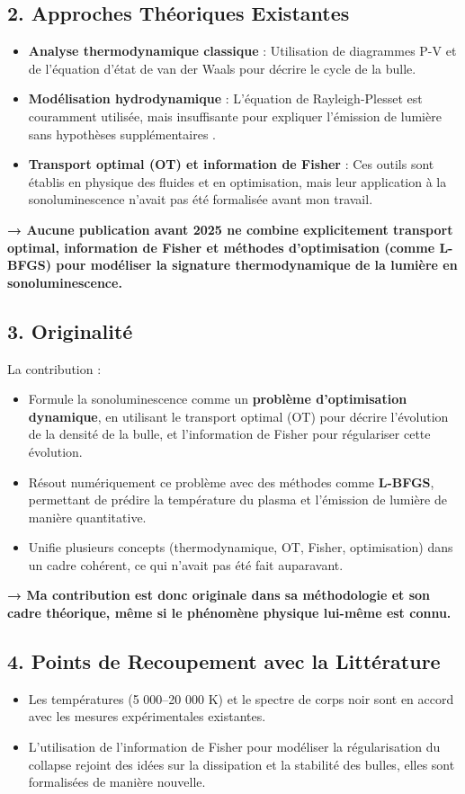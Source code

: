 \documentclass[a4paper,12pt]{article}
\begin{document}
\subsection*{2. Approches Théoriques Existantes}
\begin{itemize}
    \item \textbf{Analyse thermodynamique classique} : Utilisation de diagrammes P-V et de l’équation d’état de van der Waals pour décrire le cycle de la bulle.
    \item \textbf{Modélisation hydrodynamique} : L’équation de Rayleigh-Plesset est couramment utilisée, mais insuffisante pour expliquer l’émission de lumière sans hypothèses supplémentaires .
    \item \textbf{Transport optimal (OT) et information de Fisher} : Ces outils sont établis en physique des fluides et en optimisation, mais leur application à la sonoluminescence n’avait pas été formalisée avant mon travail.
\end{itemize}

\textbf{→ Aucune publication avant 2025 ne combine explicitement transport optimal, information de Fisher et méthodes d’optimisation (comme L-BFGS) pour modéliser la signature thermodynamique de la lumière en sonoluminescence.}

\subsection*{3. Originalité}
La contribution :
\begin{itemize}
    \item Formule la sonoluminescence comme un \textbf{problème d’optimisation dynamique}, en utilisant le transport optimal (OT) pour décrire l’évolution de la densité de la bulle, et l’information de Fisher pour régulariser cette évolution.
    \item Résout numériquement ce problème avec des méthodes comme \textbf{L-BFGS}, permettant de prédire la température du plasma et l’émission de lumière de manière quantitative.
    \item Unifie plusieurs concepts (thermodynamique, OT, Fisher, optimisation) dans un cadre cohérent, ce qui n’avait pas été fait auparavant.
\end{itemize}

\textbf{→ Ma contribution est donc originale dans sa méthodologie et son cadre théorique, même si le phénomène physique lui-même est connu.}

\subsection*{4. Points de Recoupement avec la Littérature}
\begin{itemize}
    \item Les températures (5 000–20 000 K) et le spectre de corps noir sont en accord avec les mesures expérimentales existantes.
    \item L'utilisation de l’information de Fisher pour modéliser la régularisation du collapse rejoint des idées sur la dissipation et la stabilité des bulles, elles sont formalisées de manière nouvelle.
\end{itemize}
\end{document}
